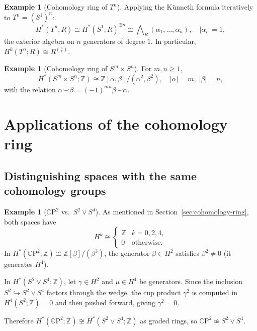 \documentclass[12pt,a4paper,openany]{book}
\theoremstyle{definition}
\newtheorem{example}[definition]{Example}
\theoremstyle{plain}
\theoremstyle{remark}
\newcommand{\Z}{\mathbb{Z}}
\newcommand{\CP}{\mathbb{C}\mathrm{P}}
\newcommand{\abs}[1]{\left|#1\right|}
\begin{document}
\begin{example}[Cohomology ring of $T^n$]
Applying the K\"unneth formula iteratively to $T^n=(S^1)^n$:
\[
  H^*(T^n;R) \cong H^*(S^1;R)^{\otimes n}
  \cong \bigwedge\nolimits_R(\alpha_1,\ldots,\alpha_n),
  \quad \abs{\alpha_i}=1,
\]
the exterior algebra on $n$ generators of degree $1$.
In particular, $H^k(T^n;R)\cong R^{\binom{n}{k}}$.
\end{example}

\begin{example}[Cohomology ring of $S^m\times S^n$]
For $m,n\geq 1$,
\[
  H^*(S^m\times S^n;\Z) \cong \Z[\alpha,\beta]/(\alpha^2,\beta^2),
  \quad \abs{\alpha}=m,\;\abs{\beta}=n,
\]
with the relation $\alpha\smile\beta=(-1)^{mn}\beta\smile\alpha$.
\end{example}

\section{Applications of the cohomology ring}
\label{sec:coh-applications}

\subsection{Distinguishing spaces with the same cohomology groups}

\begin{example}[$\CP^2$ vs.\ $S^2\vee S^4$]
\label{ex:cp2-vs-wedge}
As mentioned in Section~\ref{sec:cohomology-ring}, both spaces have
\[
  H^k \cong
  \begin{cases}
    \Z & k=0,2,4,\\
    0  & \text{otherwise.}
  \end{cases}
\]
In $H^*(\CP^2;\Z)\cong\Z[\beta]/(\beta^3)$, the generator
$\beta\in H^2$ satisfies $\beta^2\neq 0$ (it generates $H^4$).

In $H^*(S^2\vee S^4;\Z)$, let $\gamma\in H^2$ and $\mu\in H^4$ be
generators. Since the inclusion $S^2\hookrightarrow S^2\vee S^4$
factors through the wedge, the cup product $\gamma^2$ is computed
in $H^4(S^2;\Z)=0$ and then pushed forward, giving $\gamma^2=0$.

Therefore $H^*(\CP^2;\Z)\not\cong H^*(S^2\vee S^4;\Z)$ as graded
rings, so $\CP^2\not\simeq S^2\vee S^4$.
\end{example}
\end{document}
